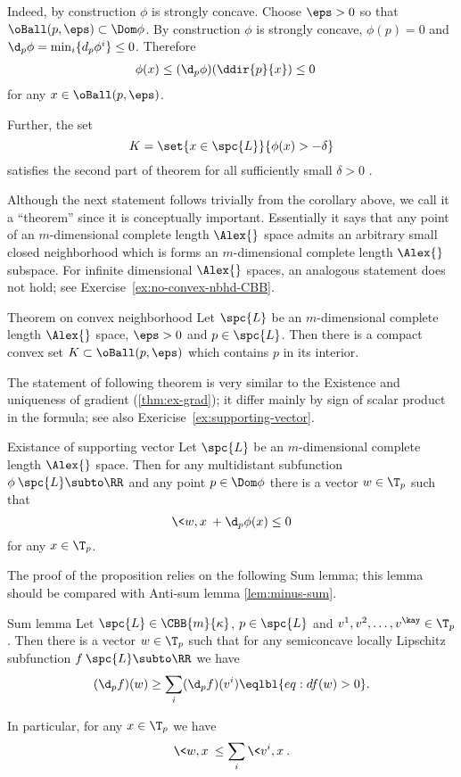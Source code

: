 Indeed, by construction $\phi$ is strongly concave.
Choose $\eps>0$ so that
$\oBall(p,\eps)\subset \Dom \phi$. 
By construction $\phi$ is strongly concave,
$\phi(p)=0$ and
$\d_p\phi=\min_i\{d_p\phi^i\}\le 0$.
Therefore 
\begin{align*}
\phi(x)&
\le (\d_p\phi)(\ddir{p}{x})
\le 0
\end{align*}
for any $x\in \oBall(p,\eps)$.

Further, 
the set
$$K=\set{x\in\spc{L}}{\phi(x)>-\delta}$$
satisfies the second part of theorem for all sufficiently small $\delta>0$ .
\qeds

Although the next statement follows trivially from the corollary above,
we call it a ``theorem'' since it is conceptually important.
Essentially it says that any point of an $m$-dimensional complete length $\Alex{}$ space admits
an arbitrary small closed neighborhood 
which is forms an $m$-dimensional complete length $\Alex{}$ subspace.
For infinite dimensional $\Alex{}$ spaces, 
an analogous statement does not hold;
see Exercise~\ref{ex:no-convex-nbhd-CBB}.

\begin{thm}{Theorem on convex neighborhood}\label{thm:convex-nbhd}
Let $\spc{L}$ be an $m$-dimensional complete length $\Alex{}$ space, 
$\eps>0$ 
and $p\in\spc{L}$.
Then 
there is a compact convex set $K\subset\oBall(p,\eps)$
which contains $p$ in its interior.
\end{thm}

The statement of following theorem is very similar to the Existence and uniqueness of gradient (\ref{thm:ex-grad});
it differ mainly by sign of scalar product in the formula;
see also Exericise~\ref{ex:supporting-vector}.

\begin{thm}{Existance of supporting vector}
\label{prop:support}
Let $\spc{L}$ be an $m$-dimensional complete length $\Alex{}$ space.
Then for any multidistant subfunction $\phi\:\spc{L}\subto\RR$ 
and any point $p\in \Dom\phi$
there is a vector $w\in \T_p$ such that 
\[\<w,x\>+\d_p\phi(x)\le 0\] 
for any $x\in\T_p$.

\end{thm}

The proof of the proposition relies on the following Sum lemma;
this lemma should be compared with Anti-sum lemma \ref{lem:minus-sum}. 

\begin{thm}{Sum lemma}\label{lem:sum}
Let  $\spc{L}\in\CBB{m}{\kappa}$, 
$p\in  \spc{L}$ and $v^1,v^2,\dots,v^\kay\in\T_p$.
Then there is a vector $w\in \T_p$ such that for any semiconcave locally Lipschitz subfunction $f\:\spc{L}\subto\RR$ we have
\[(\d_pf)(w)\ge \sum_i(\d_pf)(v^i)\eqlbl{eq:df(w)>0}.\]

In particular, for any $x\in\T_p$ we have 
\[\<w,x\>\le \sum_i\<v^i,x\>.\]

\end{thm}

